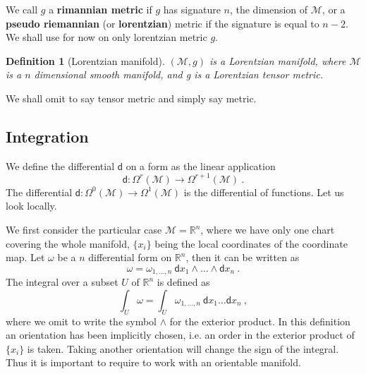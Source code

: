 \documentclass[10pt]{book}
\let\int\int
\newcommand{\Mcal}{\mathcal{M}}
\newcommand{\Rbb}{\mathbb{R}}
\newcommand{\dsf}{\mathsf{d}}
\theoremstyle{break}
\newtheorem{definition}{Definition}
\begin{document}
\bigskip


We call $g$ a \textbf{rimannian metric} if $g$ has signature $n$, the dimension of $\Mcal$, or a \textbf{pseudo riemannian} (or \textbf{lorentzian}) metric if the signature is equal to $n-2$. We shall use for now on only lorentzian metric $g$.


\begin{definition}[Lorentzian manifold]\label{def:lorentzian_M}
$(\Mcal,g)$ is a Lorentzian manifold, where $\Mcal$ is a $n$ dimensional smooth manifold, and g is a Lorentzian tensor metric.
\end{definition}


We shall omit to say tensor metric and simply say metric.


\subsection{Integration}


We define the differential $\dsf$ on a form as the linear application
%
\begin{equation*}
\dsf : \Omega^r(\Mcal) \to \Omega^{r+1}(\Mcal) \ .
\end{equation*}
%
The differential $\dsf : \Omega^0(\Mcal) \to \Omega^1(\Mcal)$ is the differential of functions. Let us look locally. 


\bigskip


We first consider the particular case $\Mcal=\Rbb^n$, where we have only one chart covering the whole manifold, $\{x_i\}$ being the local coordinates of the coordinate map. Let $\omega$ be a $n$ differential form on $\Rbb^n$, then it can be written as
%
\begin{equation*}
\omega = \omega_{1,\dots,n} \ \dsf x_{1} \wedge \dots \wedge \dsf x_{n} \ .
\end{equation*}
%
The integral over a subset $U$ of $\Rbb^n$ is defined as 
%
\begin{equation*}
\int_U \omega = \int_U \omega_{1,\dots,n} \ \dsf x_{1} \dots \dsf x_{n} \ ,
\end{equation*}
%
where we omit to write the symbol $\wedge$ for the exterior product.
%
In this definition an orientation has been implicitly chosen, i.e. an order in the exterior product of $\{x_i\}$ is taken. Taking another orientation will change the sign of the integral. Thus it is important to require to work with an orientable manifold.
\end{document}
